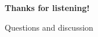 \begin{frame}[c]
  \centering
  {\color{rwth-blue-100}\fontsize{25}{30}\selectfont\bfseries
    Thanks for listening!\par}
  \vspace{5mm}
  {\color{black!65}\large Questions and discussion\par}
\end{frame}
